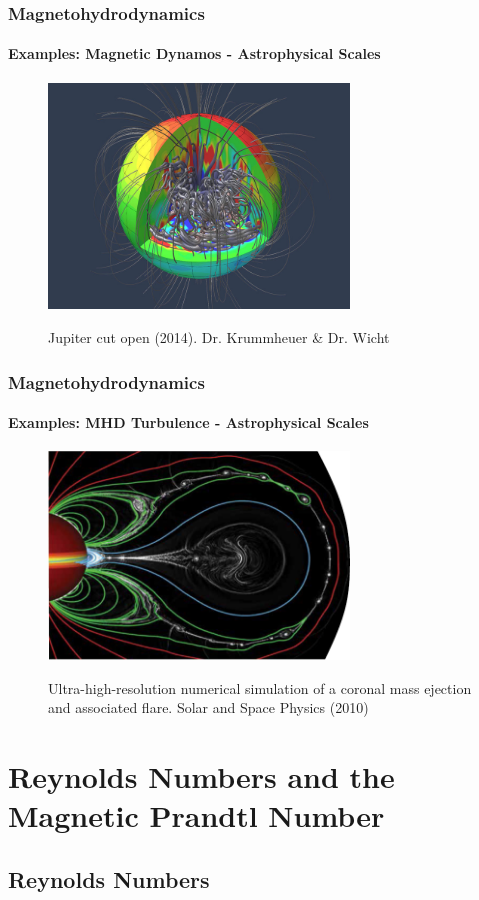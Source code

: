 \documentclass{beamer}
\begin{document}
\begin{frame}
 \frametitle{Magnetohydrodynamics}
 \framesubtitle{Examples: Magnetic Dynamos - Astrophysical Scales}
 
 \begin{figure}[t]
  \includegraphics[width=8cm]{img/jupiter_dynamo}
  \label{Fig:2}
  \caption{Jupiter cut open (2014). Dr. Krummheuer \& Dr. Wicht}
  \centering
 \end{figure}
\end{frame}

\begin{frame}
 \frametitle{Magnetohydrodynamics}
 \framesubtitle{Examples: MHD Turbulence - Astrophysical Scales}
 \begin{figure}[t]
  \includegraphics[width=8cm]{img/solar_flare}
  \label{Fig:3}
  \caption{Ultra-high-resolution numerical simulation of a coronal mass ejection and associated flare. Solar and Space Physics (2010)}
  \centering
 \end{figure}

\end{frame}

\section{Reynolds Numbers and the Magnetic Prandtl Number}

\subsection{Reynolds Numbers}
\end{document}
